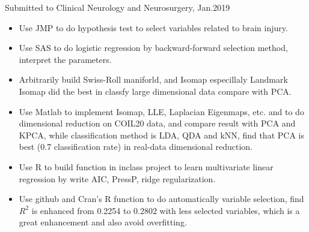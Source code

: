 \documentclass{resume}
\begin{document}
Submitted to Clinical Neurology and Neurosurgery, Jan.2019
\begin{itemize}
   \item Use JMP to do hypothesis test to select variables related to brain injury.
  \item Use SAS to do logistic regression by backward-forward selection method, interpret the parameters.
\end{itemize}

\begin{itemize}
  \item Arbitrarily build Swiss-Roll maniforld, and Isomap especillaly Landmark Isomap did the best in classfy large dimensional data compare with PCA.
  \item Use Matlab to implement Isomap, LLE, Laplacian Eigenmaps, etc. and to do dimensional reduction on COIL20 data, and compare result with PCA and KPCA, while classification method is LDA, QDA and kNN, find that PCA is best (0.7 classification rate) in real-data dimensional reduction.
  
\end{itemize}

\begin{itemize}
  \item Use R to build function in inclass project to learn multivariate linear regression by write AIC, PressP, ridge  regularization. 
  \item Use github and Cran's R function to do automatically variable selection, find $R^{2}$ is enhanced from 0.2254 to 0.2802 with less selected variables, which is a great enhancement and also avoid overfitting.
\end{itemize}



%
%
\end{document}
